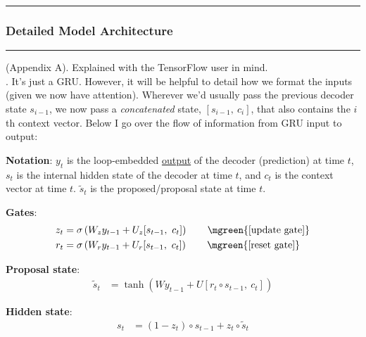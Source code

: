 \documentclass[11pt]{article}
\newcommand\myspace[1][]{\vspace{#1\bigskipamount}}
\newcommand\p{\Needspace{10\baselineskip} \noindent}
\newcommand\subsub[1]{\Needspace{15\baselineskip}\hrule\subsubsection{#1}\hrule}
\begin{document}
\myspace
\subsub{Detailed Model Architecture}

(Appendix A). Explained with the TensorFlow user in mind.\\

\myspace
\p {}. It's just a GRU. However, it will be helpful to detail how we format the inputs (given we now have attention). Wherever we'd usually pass the previous decoder state $s_{i - 1}$, we now pass a \textit{concatenated} state, $[s_{i - 1},~ c_i]$, that also contains the $i$th context vector. Below I go over the flow of information from GRU input to output:
\begin{compactenum}
	\item \textbf{Notation}: $y_t$ is the loop-embedded \underline{output} of the decoder (prediction) at time $t$, $s_t$ is the internal hidden state of the decoder at time $t$, and $c_t$ is the context vector at time $t$. $\tilde s_t$ is the proposed/proposal state at time $t$.
	\item \textbf{Gates}:
	\begin{align}
		z_t &= \sigma\left( W_z y_{t - 1} + U_z [s_{t - 1},~ c_t] \right)
		\qquad \mgreen{\text{[update gate]}} \\
		r_t &= \sigma\left( W_r y_{t - 1} + U_r [s_{t - 1},~ c_t] \right)
		\qquad \mgreen{\text{[reset gate]}} \\
	\end{align}
		
	\item \textbf{Proposal state}:
	\begin{align}
		\tilde s_t &= \tanh\left( W y_{t - 1} + U [r_t \circ s_{t - 1}, ~ c_t]  \right)
	\end{align}
	
	\item \textbf{Hidden state}:
	\begin{align}
		s_t &= (1 - z_t) \circ s_{t - 1} + z_t \circ \tilde s_t
	\end{align}
	
\end{compactenum}
\end{document}
